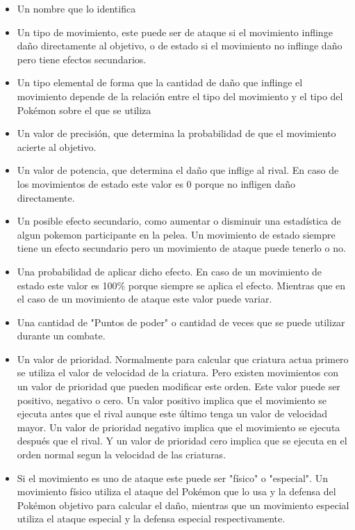 \begin{itemize}
    \begin{itemize}
        \item Un nombre que lo identifica
        \item Un tipo de movimiento, este puede ser de ataque si el movimiento inflinge daño directamente al objetivo, o de estado si el movimiento no inflinge daño pero tiene efectos secundarios.
        \item  Un tipo elemental de forma que la cantidad de daño que inflinge el movimiento depende de la relación entre el tipo del movimiento y el tipo del Pokémon sobre el que se utiliza
        \item Un valor de precisión, que determina la probabilidad de que el movimiento acierte al objetivo.
        \item Un valor de potencia, que determina el daño que inflige al rival. En caso de los movimientos de estado este valor es 0 porque no infligen daño directamente.
        \item Un posible efecto secundario, como aumentar o disminuir una estadística de algun pokemon participante en la pelea. Un movimiento de estado siempre tiene un efecto secundario pero un movimiento de ataque puede tenerlo o no.
        \item Una probabilidad de aplicar dicho efecto. En caso de un movimiento de estado este valor es 100\% porque siempre se aplica el efecto. Mientras que en el caso de un movimiento de ataque este valor puede variar.
        \item Una cantidad de "Puntos de poder" o cantidad de veces que se puede utilizar durante un combate.
        \item Un valor de prioridad. Normalmente para calcular que criatura actua primero se utiliza el valor de velocidad de la criatura. Pero existen movimientos con un valor de prioridad que pueden modificar este orden. Este valor puede ser positivo, negativo o cero. Un valor positivo implica que el movimiento se ejecuta antes que el rival aunque este último tenga un valor de velocidad mayor. Un valor de prioridad negativo implica que el movimiento se ejecuta después que el rival. Y un valor de prioridad cero implica que se ejecuta en el orden normal segun la velocidad de las criaturas.
        \item Si el movimiento es uno de ataque este puede ser "físico" o "especial". Un movimiento físico utiliza el ataque del Pokémon que lo usa y la defensa del Pokémon objetivo para calcular el daño, mientras que un movimiento especial utiliza el ataque especial y la defensa especial respectivamente.

\end{itemize}
\end{itemize}
